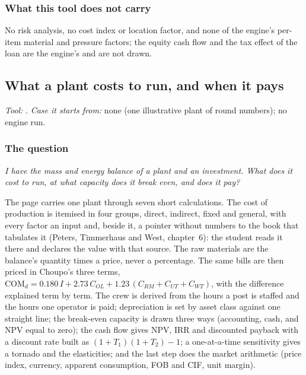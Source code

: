 \documentclass[11pt,a4paper]{article}
\begin{document}
\subsubsection*{What this tool does not carry}

No risk analysis, no cost index or location factor, and none of the engine's
per-item material and pressure factors; the equity cash flow and the tax
effect of the loan are the engine's and are not drawn.

\subsection{What a plant costs to run, and when it pays}\label{sec:edu-plant-running-cost}


\noindent\textit{\small Tool:} .  \textit{\small
Case it starts from:} none (one illustrative plant of round numbers); no
engine run.

\subsubsection*{The question}

\emph{I have the mass and energy balance of a plant and an investment.  What
does it cost to run, at what capacity does it break even, and does it pay?}

The page carries one plant through seven short calculations.  The cost of
production is itemised in four groups, direct, indirect, fixed and general,
with every factor an input and, beside it, a pointer without numbers to the
book that tabulates it (Peters, Timmerhaus and West, chapter~6): the student
reads it there and declares the value with that source.  The raw materials are the balance's quantity times a price,
never a percentage.  The same bills are then priced in Choupo's three terms,
$\mathrm{COM}_d = 0.180\,I + 2.73\,C_{OL} + 1.23\,(C_{RM}+C_{UT}+C_{WT})$,
with the difference explained term by term.  The crew is derived from the
hours a post is staffed and the hours one operator is paid; depreciation is
set by asset class against one straight line; the break-even capacity is
drawn three ways (accounting, cash, and NPV equal to zero); the cash flow
gives NPV, IRR and discounted payback with a discount rate built as
$(1+T_1)(1+T_2)-1$; a one-at-a-time sensitivity gives a tornado and the
elasticities; and the last step does the market arithmetic (price index,
currency, apparent consumption, FOB and CIF, unit margin).
\end{document}
